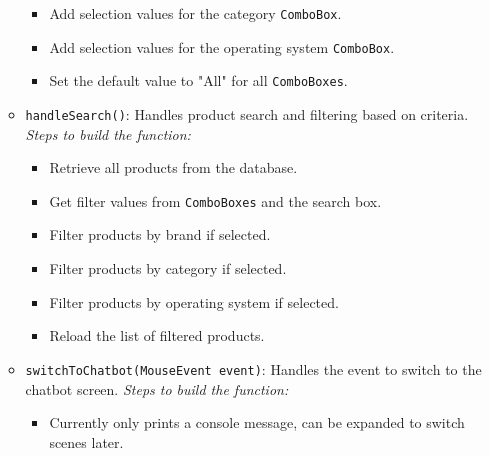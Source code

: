 \documentclass{article}
\begin{document}
\begin{itemize}
\begin{itemize}
\begin{itemize}
            \item Add selection values for the category \texttt{ComboBox}.
            \item Add selection values for the operating system \texttt{ComboBox}.
            \item Set the default value to "All" for all \texttt{ComboBoxes}.
        \end{itemize}
        \item \texttt{handleSearch()}: Handles product search and filtering based on criteria.
        \subitem \textit{Steps to build the function:}
        \begin{itemize}
            \item Retrieve all products from the database.
            \item Get filter values from \texttt{ComboBoxes} and the search box.
            \item Filter products by brand if selected.
            \item Filter products by category if selected.
            \item Filter products by operating system if selected.
            \item Reload the list of filtered products.
        \end{itemize}
        \item \texttt{switchToChatbot(MouseEvent event)}: Handles the event to switch to the chatbot screen.
        \subitem \textit{Steps to build the function:}
        \begin{itemize}
            \item Currently only prints a console message, can be expanded to switch scenes later.
        \end{itemize}
    \end{itemize}
\end{itemize}
\end{document}
